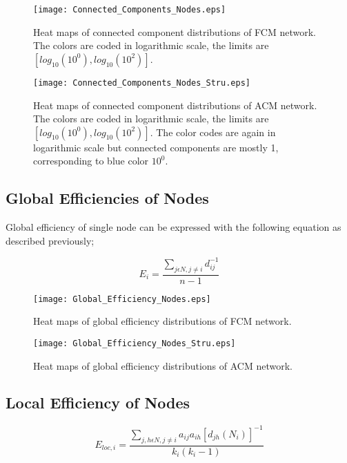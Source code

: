 \documentclass[12pt]{article}
\begin{document}
\begin{figure}[h!]
	\centering
	\texttt{[image: Connected\_Components\_Nodes.eps]}
	\caption{Heat maps of connected component distributions of FCM network. The colors are coded in logarithmic scale, the limits are $[log_{10}(10^0), log_{10}(10^2)]$.}
\end{figure}

\newpage

\begin{figure}[h!]
	\centering
	\texttt{[image: Connected\_Components\_Nodes\_Stru.eps]}
	\caption{Heat maps of connected component distributions of ACM network. The colors are coded in logarithmic scale, the limits are $[log_{10}(10^0), log_{10}(10^2)]$. The color codes are again in logarithmic scale but connected components are mostly 1, corresponding to blue color $10^0$.}
\end{figure} 

\newpage

\subsection{Global Efficiencies of Nodes}
Global efficiency of single node can be expressed with the following equation as described previously; 

\begin{equation}
 E_i =  \frac{\sum\limits_{j \epsilon N, j\neq i}d_{ij}^{-1}}{n-1 }
\end{equation}



\begin{figure}[h!]
	\centering
	\texttt{[image: Global\_Efficiency\_Nodes.eps]}
	\caption{Heat maps of global efficiency distributions of FCM network.}
\end{figure}

\newpage 


\begin{figure}[h!]
	\centering
	\texttt{[image: Global\_Efficiency\_Nodes\_Stru.eps]}
	\caption{Heat maps of global efficiency distributions of ACM network.}
\end{figure}

\newpage 

\subsection{Local Efficiency of Nodes}

\begin{equation}
 E_{loc,i} = \frac{\sum\limits_{j,h \epsilon N, j\neq i} a_{ij} a_{ih}[d_{jh}(N_i)]^{-1}}{k_i(k_i - 1) }
\end{equation}
\end{document}
